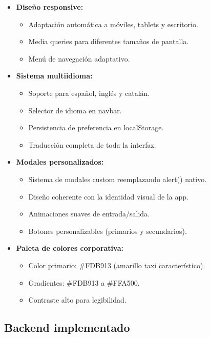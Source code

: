 \documentclass[12pt,a4paper]{article}
\begin{document}
\begin{itemize}
    \item \textbf{Diseño responsive:}
    \begin{itemize}
        \item Adaptación automática a móviles, tablets y escritorio.
        \item Media queries para diferentes tamaños de pantalla.
        \item Menú de navegación adaptativo.
    \end{itemize}
    
    \item \textbf{Sistema multiidioma:}
    \begin{itemize}
        \item Soporte para español, inglés y catalán.
        \item Selector de idioma en navbar.
        \item Persistencia de preferencia en localStorage.
        \item Traducción completa de toda la interfaz.
    \end{itemize}
    
    \item \textbf{Modales personalizados:}
    \begin{itemize}
        \item Sistema de modales custom reemplazando alert() nativo.
        \item Diseño coherente con la identidad visual de la app.
        \item Animaciones suaves de entrada/salida.
        \item Botones personalizables (primarios y secundarios).
    \end{itemize}
    
    \item \textbf{Paleta de colores corporativa:}
    \begin{itemize}
        \item Color primario: \#FDB913 (amarillo taxi característico).
        \item Gradientes: \#FDB913 a \#FFA500.
        \item Contraste alto para legibilidad.
    \end{itemize}
\end{itemize}

\subsection{Backend implementado}
\end{document}
